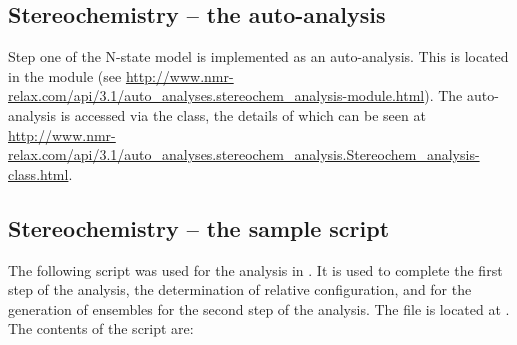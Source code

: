 
\subsection{Stereochemistry -- the auto-analysis}


Step one of the N-state model is implemented as an auto-analysis.
This is located in the module  (see \url{http://www.nmr-relax.com/api/3.1/auto_analyses.stereochem_analysis-module.html}).
The auto-analysis is accessed via the  class, the details of which can be seen at \url{http://www.nmr-relax.com/api/3.1/auto_analyses.stereochem_analysis.Stereochem_analysis-class.html}.



\subsection{Stereochemistry -- the sample script}

The following script was used for the analysis in \citet{Sun11}.
It is used to complete the first step of the analysis, the determination of relative configuration, and for the generation of ensembles for the second step of the analysis.
The file is located at .
The contents of the script are:


